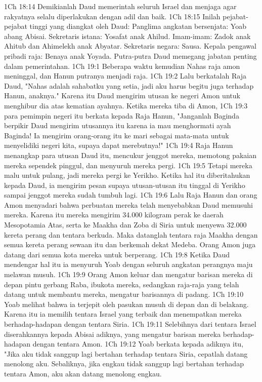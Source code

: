 1Ch 18:14  Demikianlah Daud memerintah seluruh Israel dan menjaga agar rakyatnya selalu diperlakukan dengan adil dan baik.
1Ch 18:15  Inilah pejabat-pejabat tinggi yang diangkat oleh Daud: Panglima angkatan bersenjata: Yoab abang Abisai. Sekretaris istana: Yosafat anak Ahilud. Imam-imam: Zadok anak Ahitub dan Ahimelekh anak Abyatar. Sekretaris negara: Sausa. Kepala pengawal pribadi raja: Benaya anak Yoyada. Putra-putra Daud memegang jabatan penting dalam pemerintahan.
1Ch 19:1  Beberapa waktu kemudian Nahas raja amon meninggal, dan Hanun putranya menjadi raja.
1Ch 19:2  Lalu berkatalah Raja Daud, "Nahas adalah sahabatku yang setia, jadi aku harus begitu juga terhadap Hanun, anaknya." Karena itu Daud mengirim utusan ke negeri Amon untuk menghibur dia atas kematian ayahnya. Ketika mereka tiba di Amon,
1Ch 19:3  para pemimpin negeri itu berkata kepada Raja Hanun, "Janganlah Baginda berpikir Daud mengirim utusannya itu karena ia mau menghormati ayah Baginda! Ia mengirim orang-orang itu ke mari sebagai mata-mata untuk menyelidiki negeri kita, supaya dapat merebutnya!"
1Ch 19:4  Raja Hanun menangkap para utusan Daud itu, mencukur jenggot mereka, memotong pakaian mereka sependek pinggul, dan menyuruh mereka pergi.
1Ch 19:5  Tetapi mereka malu untuk pulang, jadi mereka pergi ke Yerikho. Ketika hal itu diberitahukan kepada Daud, ia mengirim pesan supaya utusan-utusan itu tinggal di Yerikho sampai jenggot mereka sudah tumbuh lagi.
1Ch 19:6  Lalu Raja Hanun dan orang Amon menyadari bahwa perbuatan mereka telah menyebabkan Daud memusuhi mereka. Karena itu mereka mengirim 34.000 kilogram perak ke daerah Mesopotamia Atas, serta ke Maakha dan Zoba di Siria untuk menyewa 32.000 kereta perang dan tentara berkuda. Maka datanglah tentara raja Maakha dengan semua kereta perang sewaan itu dan berkemah dekat Medeba. Orang Amon juga datang dari semua kota mereka untuk berperang.
1Ch 19:8  Ketika Daud mendengar hal itu ia menyuruh Yoab dengan seluruh angkatan perangnya maju melawan musuh.
1Ch 19:9  Orang Amon keluar dan mengatur barisan mereka di depan pintu gerbang Raba, ibukota mereka, sedangkan raja-raja yang telah datang untuk membantu mereka, mengatur barisannya di padang.
1Ch 19:10  Yoab melihat bahwa ia terjepit oleh pasukan musuh di depan dan di belakang. Karena itu ia memilih tentara Israel yang terbaik dan menempatkan mereka berhadap-hadapan dengan tentara Siria.
1Ch 19:11  Selebihnya dari tentara Israel diserahkannya kepada Abisai adiknya, yang mengatur barisan mereka berhadap-hadapan dengan tentara Amon.
1Ch 19:12  Yoab berkata kepada adiknya itu, "Jika aku tidak sanggup lagi bertahan terhadap tentara Siria, cepatlah datang menolong aku. Sebaliknya, jika engkau tidak sanggup lagi bertahan terhadap tentara Amon, aku akan datang menolong engkau.

